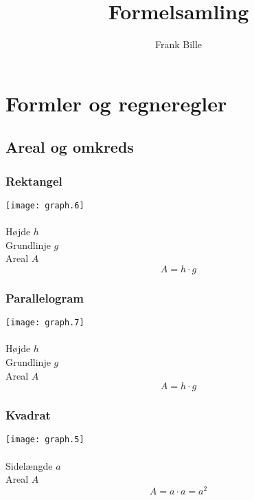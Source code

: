 \documentclass[11pt,a5paper,fleqn,leqno]{book}
\author{Frank Bille}
\title{Formelsamling}
\begin{document}
\setlength{\parindent}{0cm}

\frontmatter

\tableofcontents

\mainmatter

\pagestyle{headings}

\chapter{Formler og regneregler}

\newpage

\section{Areal og omkreds}

\subsection{Rektangel}

\texttt{[image: graph.6]}
\\
\\
Højde $h$ \\
Grundlinje $g$ \\
Areal $A$
\begin{equation} \label{eq:areal_rektangle}
A = h \cdot g
\end{equation}

\subsection{Parallelogram}

\texttt{[image: graph.7]}
\\
\\
Højde $h$ \\
Grundlinje $g$ \\
Areal $A$
\begin{equation}
A = h \cdot g
\end{equation}

\subsection{Kvadrat}

\texttt{[image: graph.5]}
\\
\\
Sidelængde $a$ \\
Areal $A$
\begin{equation}
A = a \cdot a = a^2
\end{equation}
\end{document}
